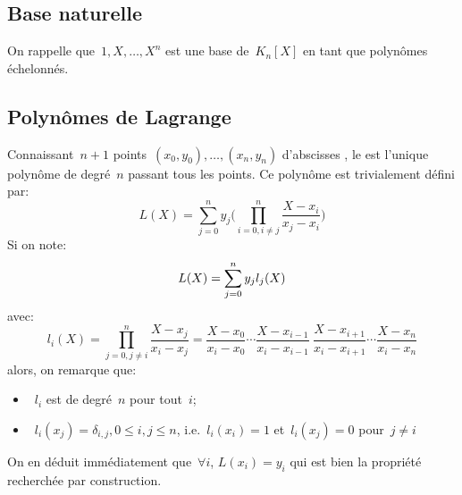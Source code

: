 \subsection{Base naturelle} 
On rappelle que~$1,X,\ldots,X^n$ est une base de~$K_n[X]$ en tant que polynômes échelonnés. 
\subsection{Polynômes de Lagrange} 
Connaissant~$n + 1$ points~$(x_0, y_0),\dots,(x_n, y_n)$ d'abscisses , le  est l'unique polynôme de degré~$n$ passant tous les points. Ce polynôme est trivialement défini par: 
\begin{equation}
L(X) = \sum_{j=0}^{n} y_j \biggl(\prod_{i=0, i\neq j}^{n} \frac{X-x_i}{x_j-x_i} \biggr) 
\end{equation}
Si on note:
\begin{equation}
L(X) = \displaystyle\sum_{j=0}^{n} y_j l_j(X)
\end{equation}
avec:
\begin{equation}
l_i(X) = \prod_{j=0, j\neq i}^{n} \frac{X-x_j}{x_i-x_j} = \frac{X-x_0}{x_i-x_0} \cdots \frac{X-x_{i-1}}{x_i-x_{i-1}} ~ \frac{X-x_{i+1}}{x_i-x_{i+1}} \cdots \frac{X-x_{n}}{x_i-x_{n}}
\end{equation}
alors, on remarque que: 
\begin{itemize}
\item~$l_i$ est de degré~$n$ pour tout~$i$; 
\item~$l_i(x_j) = \delta_{i,j}, 0 \leq i,j \leq n$, i.e.~$l_i(x_i) = 1$ et~$l_i(x_j) = 0$ pour~$j\ne i$ 
\end{itemize}
On en déduit immédiatement que~$\forall i$, $L(x_i) = y_i$ qui est bien la propriété recherchée par construction. 
